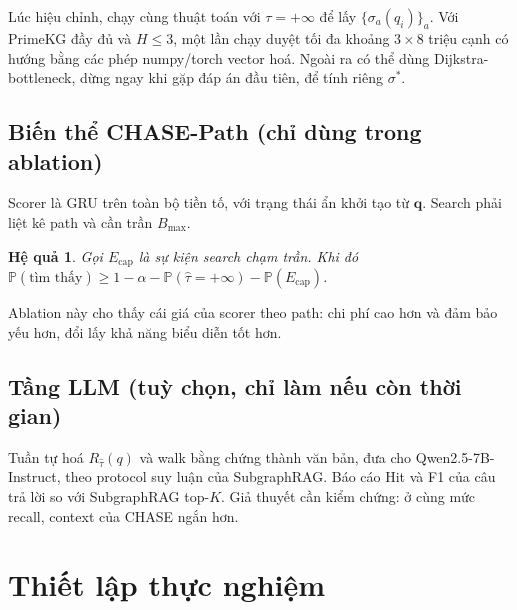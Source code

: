 \documentclass[11pt,a4paper]{article}
\newtheorem{corollary}{Hệ quả}
\theoremstyle{remark}
\newcommand{\Prob}{\mathbb{P}}
\newcommand{\tauhat}{\hat{\tau}}
\newcommand{\method}{\textsc{CHASE}}
\begin{document}
\noindent Lúc hiệu chỉnh, chạy cùng thuật toán với $\tau=+\infty$ để lấy $\{\sigma_a(q_i)\}_a$. Với PrimeKG đầy đủ và $H\le3$, một lần chạy duyệt tối đa khoảng $3\times8$ triệu cạnh có hướng bằng các phép numpy/torch vector hoá. Ngoài ra có thể dùng Dijkstra-bottleneck, dừng ngay khi gặp đáp án đầu tiên, để tính riêng $\sigma^*$.

\subsection{Biến thể \method-Path (chỉ dùng trong ablation)}\label{sec:pathvariant}
Scorer là GRU trên toàn bộ tiền tố, với trạng thái ẩn khởi tạo từ $\mathbf{q}$. Search phải liệt kê path và cần trần $B_{\max}$.
\begin{corollary}
Gọi $E_{\mathrm{cap}}$ là sự kiện search chạm trần. Khi đó $\Prob(\text{tìm thấy})\ge1-\alpha-\Prob(\tauhat=+\infty)-\Prob(E_{\mathrm{cap}})$.
\end{corollary}
\noindent Ablation này cho thấy cái giá của scorer theo path: chi phí cao hơn và đảm bảo yếu hơn, đổi lấy khả năng biểu diễn tốt hơn.

\subsection{Tầng LLM (tuỳ chọn, chỉ làm nếu còn thời gian)}
Tuần tự hoá $R_{\tauhat}(q)$ và walk bằng chứng thành văn bản, đưa cho Qwen2.5-7B-Instruct, theo protocol suy luận của SubgraphRAG. Báo cáo Hit và F1 của câu trả lời so với SubgraphRAG top-$K$. Giả thuyết cần kiểm chứng: ở cùng mức recall, context của \method{} ngắn hơn.

\section{Thiết lập thực nghiệm}\label{sec:exp}
\end{document}
